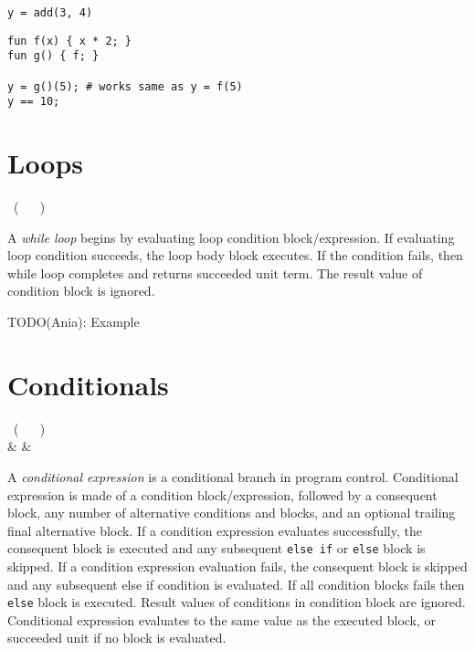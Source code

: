 \begin{example}
\begin{lstlisting}
y = add(3, 4)
\end{lstlisting}
\end{example}

\begin{example}
\begin{lstlisting}[mathescape=true]
fun f(x) { x * 2; }
fun g() { f; }

y = g()(5); # works same as y = f(5)
y == 10;
\end{lstlisting}
\end{example}

\section{Loops}

\begin{bnf}
   \eq {} \ ( \  \gor {} \ ) \ 
\end{bnf}

A \emph{while loop} begins by evaluating loop condition block/expression. If evaluating loop condition succeeds, the loop body block executes. If the condition fails, then while loop completes and returns succeeded unit term. The result value of condition block is ignored.

TODO(Ania): Example

\section{Conditionals}

\begin{bnf}
   \eq {} \ ( \  \gor {} \ ) \  \\
              & & 
\end{bnf}

A \emph{conditional expression} is a conditional branch in program control. Conditional expression is made of a condition block/expression, followed by a consequent block, any number of alternative conditions and blocks, and an optional trailing final alternative block. If a condition expression evaluates successfully, the consequent block is executed and any subsequent \lstinline{else if} or \lstinline{else} block is skipped. If a condition expression evaluation fails, the consequent block is skipped and any subsequent else if condition is evaluated. If all condition blocks fails then \lstinline{else} block is executed. Result values of conditions in condition block are ignored. Conditional expression evaluates to the same value as the executed block, or succeeded unit if no block is evaluated.

